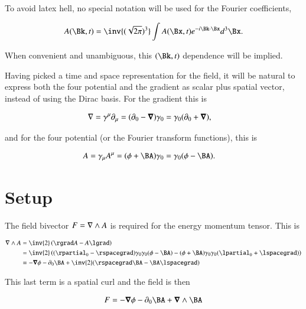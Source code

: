 To avoid latex hell, no special notation will be used for the Fourier coefficients,

\begin{align}
\label{eqn:ftMaxVacuum:3a}
A(\Bk, t) = \inv{(\sqrt{2 \pi})^3} \int A(\Bx, t) e^{-i \Bk \cdot \Bx } d^3 \Bx.
\end{align}

When convenient and unambiguous, this $(\Bk,t)$ dependence will be implied.

Having picked a time and space representation for the field, it will be natural to express both the four potential and the gradient as scalar plus spatial vector, instead of using the Dirac basis.  For the gradient this is

\begin{align}
\label{eqn:ftMaxVacuum:4}
\nabla &= \gamma^\mu \partial_\mu = (\partial_0 - \boldsymbol{\nabla}) \gamma_0 = \gamma_0 (\partial_0 + \boldsymbol{\nabla}),
\end{align}

and for the four potential (or the Fourier transform functions), this is

\begin{align}
\label{eqn:ftMaxVacuum:5}
A &= \gamma_\mu A^\mu = (\phi + \BA) \gamma_0 = \gamma_0 (\phi - \BA).
\end{align}

\section{Setup}

The field bivector $F = \nabla \wedge A$ is required for the energy momentum tensor.  This is

\begin{align*}
\grad \wedge A
&= \inv{2}\left( \rgrad A - A \lgrad \right) \\
&= \inv{2}\left( (\rpartial_0 - \rspacegrad) \gamma_0 \gamma_0 (\phi - \BA)
-
(\phi + \BA) \gamma_0 \gamma_0 (\lpartial_0 + \lspacegrad)
\right) \\
&= -\spacegrad \phi -\partial_0 \BA + \inv{2}(\rspacegrad \BA - \BA \lspacegrad)
\end{align*}

This last term is a spatial curl and the field is then

\begin{align}
\label{eqn:ftMaxVacuum:6}
F = -\spacegrad \phi -\partial_0 \BA + \spacegrad \wedge \BA
\end{align}

